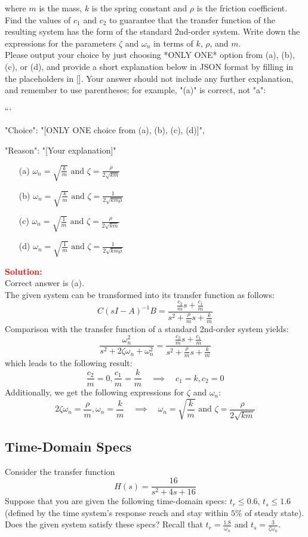 \documentclass[12pt]{article}
\begin{document}
where $m$ is the mass, $k$ is the spring constant and $\rho$ is the friction coefficient. Find the values of $c_1$ and $c_2$ to guarantee that the transfer function of the resulting system has the form of the
standard 2nd-order system. Write down the expressions for the parameters $\zeta$ and $\omega_n$ in terms of $k$, $\rho$, and $m$. \\
Please output your choice by just choosing *ONLY ONE* option from (a), (b), (c), or (d), and provide a short explanation below in JSON format by filling in the placeholders in []. Your answer should not include any further explanation, and remember to use parentheses; for example, "(a)" is correct, not "a":

```
{

"Choice": "[ONLY ONE choice from (a), (b), (c), (d)]",

"Reason": "[Your explanation]"

}

\begin{itemize}
    \item[(a)] \(\omega_n=\sqrt{\frac{k}{m}} \text{  and  } \zeta=\frac{\rho}{2 \sqrt{k m}}\)
    \item[(b)] \(\omega_n=\sqrt{\frac{k}{m}} \text{  and  } \zeta=\frac{1}{2 \sqrt{k m \rho}}\)
    \item[(c)] \(\omega_n=\sqrt{\frac{1}{m}} \text{  and  } \zeta=\frac{\rho}{2 \sqrt{k m}}\)
    \item[(d)] \(\omega_n=\sqrt{\frac{1}{m}} \text{  and  } \zeta=\frac{1}{2 \sqrt{k m \rho}}\)
\end{itemize}
\noindent \textbf{\textcolor{red}{Solution:}} \\
Correct answer is (a).\\
The given system can be transformed into its transfer function as follows:
\[
C(s I -A)^{-1}B=\frac{\frac{c_2}{m}s+\frac{c_1}{m}}{s^2+\frac{\rho}{m}s+\frac{k}{m}}
\]
Comparison with the transfer function of a standard 2nd-order system yields:
\[
\frac{\omega_n^2}{s^2+2 \zeta \omega_n+\omega_n^2}=\frac{\frac{c_2}{m}s+\frac{c_1}{m}}{s^2+\frac{\rho}{m}s+\frac{k}{m}}
\]
which leads to the following result:
\[
\frac{c_2}{m}=0, \frac{c_1}{m}=\frac{k}{m} \quad \implies \quad c_1=k,c_2=0
\]
Additionally, we get the following expressions for $\zeta$ and $\omega_n$:
\[
2 \zeta \omega_n=\frac{\rho}{m}, \omega_n=\frac{k}{m} \quad \implies \quad \omega_n=\sqrt{\frac{k}{m}} \text{  and  } \zeta=\frac{\rho}{2 \sqrt{k m}}
\]
\clearpage

\subsection{Time-Domain Specs}
Consider the transfer function 
\[
H(s)=\frac{16}{s^2+4s+16}
\]
Suppose that you are given the following time-domain specs: $t_r \leq 0.6$, $t_s \leq 1.6$ (defined by the time system's response reach and stay within $5\%$ of steady state). Does the given system satisfy these specs? Recall that $t_r=\frac{1.8}{\omega_n}$ and $t_s=\frac{3}{\zeta \omega_n}$. \\
\end{document}
